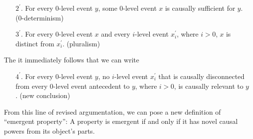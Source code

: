 \documentclass{article}
\newcommand{\p}{^\prime}
\begin{document}
\begin{enumerate}
    \item[$2\p$.] For every 0-level event $y$, some 0-level event $x$ is causally sufficient for $y$. (0-determinism)
    \item[$3\p$.] For every 0-level event $x$ and every $i$-level event $x\p_i$, where $i > 0$, $x$ is distinct from $x\p_i$. (pluralism)
\end{enumerate}

The it immediately follows that we can write

\begin{enumerate}
    \item[$4\p$.] For every 0-level event $y$, no $i$-level event $x\p_i$ that is causally disconnected from every 0-level event antecedent to $y$, where $i > 0$, is causally relevant to $y$. (new conclusion)
\end{enumerate}

From this line of revised argumentation, we can pose a new definition of ``emergent property'': A property is emergent if and only if it has novel causal powers from its object's parts.
\end{document}
